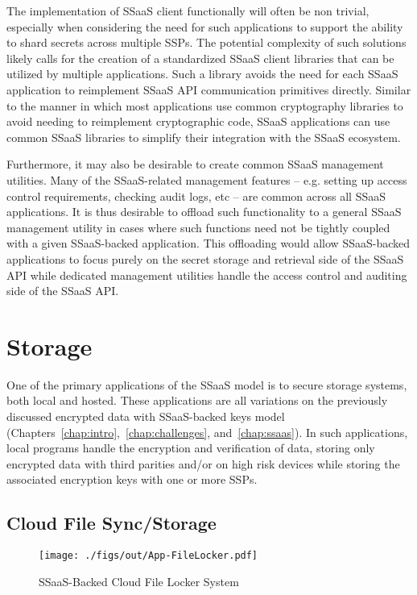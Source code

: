 The implementation of SSaaS client functionally will often be non
trivial, especially when considering the need for such applications to
support the ability to shard secrets across multiple SSPs. The
potential complexity of such solutions likely calls for the creation
of a standardized SSaaS client libraries that can be utilized by
multiple applications. Such a library avoids the need for each SSaaS
application to reimplement SSaaS API communication primitives
directly. Similar to the manner in which most applications use common
cryptography libraries to avoid needing to reimplement cryptographic
code, SSaaS applications can use common SSaaS libraries to simplify
their integration with the SSaaS ecosystem.

Furthermore, it may also be desirable to create common SSaaS
management utilities. Many of the SSaaS-related management features --
e.g. setting up access control requirements, checking audit logs, etc
-- are common across all SSaaS applications. It is thus desirable to
offload such functionality to a general SSaaS management utility in
cases where such functions need not be tightly coupled with a given
SSaaS-backed application. This offloading would allow SSaaS-backed
applications to focus purely on the secret storage and retrieval side
of the SSaaS API while dedicated management utilities handle the
access control and auditing side of the SSaaS API.

\section{Storage}

One of the primary applications of the SSaaS model is to secure
storage systems, both local and hosted. These applications are all
variations on the previously discussed encrypted data with
SSaaS-backed keys model
(Chapters~\ref{chap:intro},~\ref{chap:challenges},
and~\ref{chap:ssaas}). In such applications, local programs handle the
encryption and verification of data, storing only encrypted data with
third parities and/or on high risk devices while storing the
associated encryption keys with one or more SSPs.

\subsection{Cloud File Sync/Storage}

\begin{figure}[t]
  \centering
  \texttt{[image: ./figs/out/App-FileLocker.pdf]}
  \caption{SSaaS-Backed Cloud File Locker System}
  \label{fig:apps-filestore}
\end{figure}

